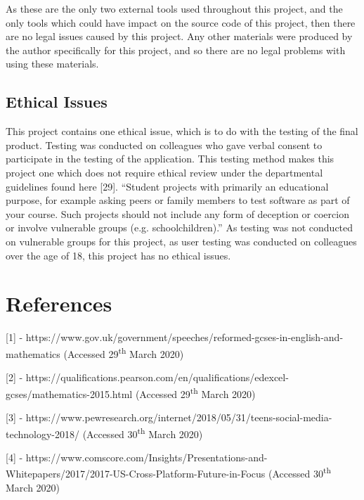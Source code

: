 \documentclass{article}
\begin{document}
As these are the only two external tools used throughout this project, and the only tools which could have impact on the source code of this project, then there are no legal issues caused by this project. Any other materials were produced by the author specifically for this project, and so there are no legal problems with using these materials. \par

\subsection{Ethical Issues}

This project contains one ethical issue, which is to do with the testing of the final product. Testing was conducted on colleagues who gave verbal consent to participate in the testing of the application. This testing method makes this project one which does not require ethical review under the departmental guidelines found here [29]. ``Student projects with primarily an educational purpose, for example asking peers or family members to test software as part of your course. Such projects should not include any form of deception or coercion or involve vulnerable groups (e.g. schoolchildren).'' As testing was not conducted on vulnerable groups for this project, as user testing was conducted on colleagues over the age of 18, this project has no ethical issues. 

\section{References}
\label{section:references}

[1] - https://www.gov.uk/government/speeches/reformed-gcses-in-english-and-mathematics (Accessed 29\textsuperscript{th} March 2020) \par

[2] - https://qualifications.pearson.com/en/qualifications/edexcel-gcses/mathematics-2015.html (Accessed 29\textsuperscript{th} March 2020) \par

[3] - https://www.pewresearch.org/internet/2018/05/31/teens-social-media-technology-2018/ (Accessed 30\textsuperscript{th} March 2020) \par

[4] - https://www.comscore.com/Insights/Presentations-and-Whitepapers/2017/2017-US-Cross-Platform-Future-in-Focus (Accessed 30\textsuperscript{th} March 2020) \par
\end{document}

